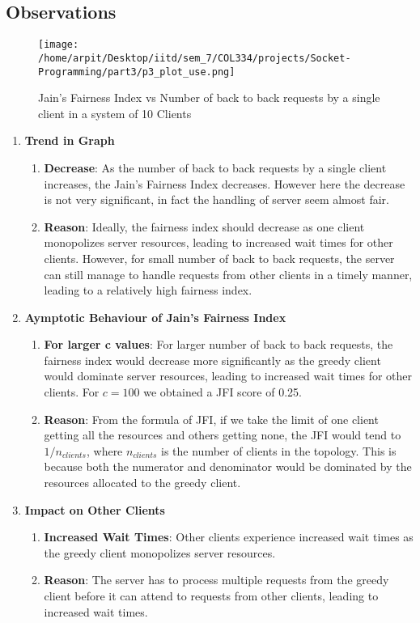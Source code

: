 \documentclass[12pt]{article}
\begin{document}
\subsection{Observations}

\begin{figure}[h!]
    \centering
    \texttt{[image: /home/arpit/Desktop/iitd/sem\_7/COL334/projects/Socket-Programming/part3/p3\_plot\_use.png]}
    \caption{Jain's Fairness Index vs Number of back to back requests by a single client in a system of 10 Clients}
    \label{fig:part3_output}
\end{figure}

\begin{enumerate}
    \item \textbf{Trend in Graph}
    \begin{enumerate}
        \item \textbf{Decrease}: As the number of back to back requests by a single client increases, the Jain's Fairness Index decreases. However here the decrease is not very significant, in fact the handling of server seem almost fair.
        \item \textbf{Reason}: Ideally, the fairness index should decrease as one client monopolizes server resources, leading to increased wait times for other clients. However, for small number of back to back requests, the server can still manage to handle requests from other clients in a timely manner, leading to a relatively high fairness index.
    \end{enumerate}
    \item \textbf{Aymptotic Behaviour of Jain's Fairness Index}
    \begin{enumerate}
        \item \textbf{For larger c values}: For larger number of back to back requests, the fairness index would decrease more significantly as the greedy client would dominate server resources, leading to increased wait times for other clients. For $c = 100$ we obtained a JFI score of 0.25.
        \item \textbf{Reason}: From the formula of JFI, if we take the limit of one client getting all the resources and others getting none, the JFI would tend to $1/n_{clients}$, where $n_{clients}$ is the number of clients in the topology. This is because both the numerator and denominator would be dominated by the resources allocated to the greedy client.
    \end{enumerate}     
    \item \textbf{Impact on Other Clients}
    \begin{enumerate}
        \item \textbf{Increased Wait Times}: Other clients experience increased wait times as the greedy client monopolizes server resources.
        \item \textbf{Reason}: The server has to process multiple requests from the greedy client before it can attend to requests from other clients, leading to increased wait times.
    \end{enumerate}
\end{enumerate}
\end{document}
